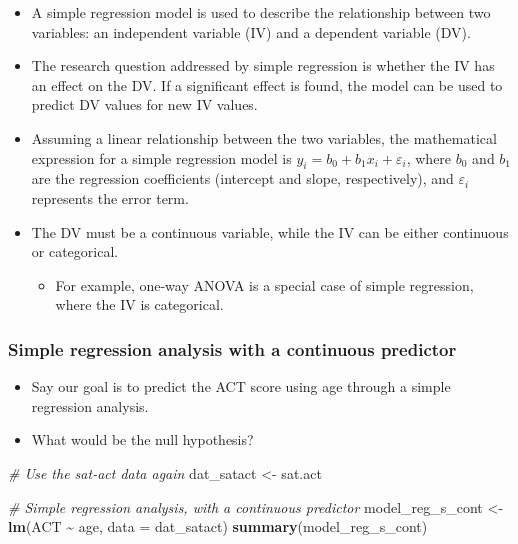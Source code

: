 \documentclass[
]{book}
\newenvironment{Shaded}{\begin{snugshade}}{\end{snugshade}}
\newcommand{\AttributeTok}[1]{\textcolor[rgb]{0.13,0.29,0.53}{#1}}
\newcommand{\CommentTok}[1]{\textcolor[rgb]{0.56,0.35,0.01}{\textit{#1}}}
\newcommand{\FunctionTok}[1]{\textcolor[rgb]{0.13,0.29,0.53}{\textbf{#1}}}
\newcommand{\NormalTok}[1]{#1}
\newcommand{\OtherTok}[1]{\textcolor[rgb]{0.56,0.35,0.01}{#1}}
\newcommand{\SpecialCharTok}[1]{\textcolor[rgb]{0.81,0.36,0.00}{\textbf{#1}}}
\providecommand{\tightlist}{%
  \setlength{\itemsep}{0pt}\setlength{\parskip}{0pt}}
\begin{document}
\begin{itemize}
\item
  A simple regression model is used to describe the relationship between two variables: an independent variable (IV) and a dependent variable (DV).
\item
  The research question addressed by simple regression is whether the IV has an effect on the DV. If a significant effect is found, the model can be used to predict DV values for new IV values.
\item
  Assuming a linear relationship between the two variables, the mathematical expression for a simple regression model is \(y_i = b_0 + b_1x_i + \varepsilon_i\), where \(b_0\) and \(b_1\) are the regression coefficients (intercept and slope, respectively), and \(\varepsilon_i\) represents the error term.
\item
  The DV must be a continuous variable, while the IV can be either continuous or categorical.

  \begin{itemize}
  \tightlist
  \item
    For example, one-way ANOVA is a special case of simple regression, where the IV is categorical.
  \end{itemize}
\end{itemize}

\subsubsection{Simple regression analysis with a continuous predictor}\label{simple-regression-analysis-with-a-continuous-predictor}

\begin{itemize}
\item
  Say our goal is to predict the ACT score using age through a simple regression analysis.
\item
  What would be the null hypothesis?
\end{itemize}

\begin{Shaded}
\begin{Highlighting}[]
\CommentTok{\# Use the sat{-}act data again}
\NormalTok{dat\_satact }\OtherTok{\textless{}{-}}\NormalTok{ sat.act}

\CommentTok{\# Simple regression analysis, with a continuous predictor}
\NormalTok{model\_reg\_s\_cont }\OtherTok{\textless{}{-}} \FunctionTok{lm}\NormalTok{(ACT }\SpecialCharTok{\textasciitilde{}}\NormalTok{ age, }\AttributeTok{data =}\NormalTok{ dat\_satact)}
\FunctionTok{summary}\NormalTok{(model\_reg\_s\_cont)}
\end{Highlighting}
\end{Shaded}
\end{document}
